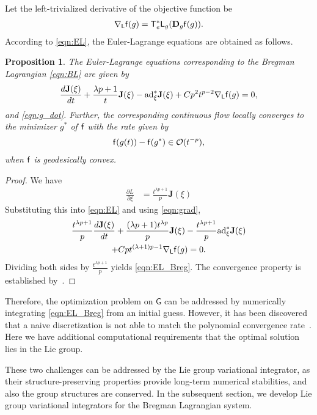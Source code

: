 \documentclass[letterpaper, 10pt, conference]{ieeeconf}
\newcommand{\deriv}[2]{\ensuremath{\frac{\partial #1}{\partial #2}}}
\newcommand{\G}{\ensuremath{\mathsf{G}}}
\newcommand{\T}{\ensuremath{\mathsf{T}}}
\renewcommand{\L}{\ensuremath{\mathsf{L}}}
\newcommand{\D}{\ensuremath{\mathbf{D}}}
\newcommand{\ad}{\ensuremath{\mathrm{ad}}}
\newtheorem{prop}{Proposition}
\begin{document}
Let the left-trivialized derivative of the objective function be
\begin{align}
    \nabla_\L \obj(g) = \T_e^*\L_g (\D_g \obj(g)).\label{eqn:grad}
\end{align}
According to \eqref{eqn:EL}, the Euler-Lagrange equations are obtained as follows.
\begin{prop}\label{prop:EL_Breg}
    The Euler-Lagrange equations corresponding to the Bregman Lagrangian \eqref{eqn:BL} are given by
    \begin{align}
        \frac{d \mathbf{J}(\xi)}{dt} + \frac{\lambda p+1}{t}\mathbf{J}(\xi) - \ad^*_\xi \mathbf{J}(\xi)
        + Cp^2 t^{p-2} \nabla_\L \obj (g) =0, \label{eqn:EL_Breg}
    \end{align}
    and \eqref{eqn:g_dot}. 
    Further, the corresponding continuous flow locally converges to the minimizer $g^*$ of $\mathsf{f}$ with the rate given by
    \begin{align}
        \mathsf{f}(g(t)) - \mathsf{f}(g^*) \in \mathcal{O}(t^{-p}),
    \end{align}
    when $\mathsf{f}$ is geodesically convex. 
\end{prop}
\begin{proof}
    We have
    \begin{align*}
        \deriv{L}{\xi} & = \frac{t^{\lambda p+1}}{p}\mathbf{J}(\xi)
    \end{align*}
    Substituting this into \eqref{eqn:EL} and using \eqref{eqn:grad}, 
    \begin{gather*}
        \frac{t^{\lambda p+1}}{p}\frac{d \mathbf{J}(\xi)}{dt} + \frac{(\lambda p+1)t^{\lambda p}}{p}\mathbf{J}(\xi) -\frac{t^{\lambda p+1}}{p} \ad^*_\xi \mathbf{J}(\xi) \\
        + Cpt^{(\lambda +1)p-1} \nabla_\L \obj(g) =0.
    \end{gather*}
    Dividing both sides by $\frac{t^{\lambda p+1}}{p}$ yields \eqref{eqn:EL_Breg}.
    The convergence property is established by~\cite[Theorem 3.2]{duruisseaux2021variational}.
\end{proof}

Therefore, the optimization problem on $\G$ can be addressed by numerically integrating \eqref{eqn:EL_Breg} from an initial guess. 
However, it has been discovered that a naive discretization is not able to match the polynomial convergence rate~\cite{wibisono2016variational}.
Here we have additional computational requirements that the optimal solution lies in the Lie group.

These two challenges can be addressed by the Lie group variational integrator, 
as their structure-preserving properties provide long-term numerical stabilities, and also the group structures are conserved. 
In the subsequent section, we develop Lie group variational integrators for the Bregman Lagrangian system. 
\end{document}
